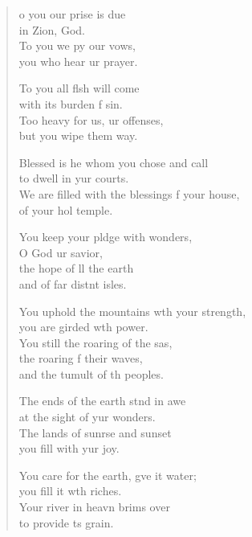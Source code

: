 \settowidth{\versewidth}{We are filled with the blessings of your house, *}
\begin{verse}%
  \begin{patverse}
o you our prise is due\Med\\
in Zion,  God.\\
To you we py our vows,\Med\\
you who hear ur prayer.

To you all flsh will come\Med\\
with its burden f sin.\\
Too heavy for us, ur offenses,\Med\\
but you wipe them way.

Blessed is he whom you chose and call\Med\\
to dwell in yur courts.\\
We are filled with the blessings f your house,\Med\\
of your hol temple.

You keep your pldge with wonders,\Med\\
O God ur savior,\\
the hope of ll the earth\Med\\
and of far distnt isles.

You uphold the mountains w\pointup{\i}th your strength,\Med\\
you are girded w\pointup{\i}th power.\\
You still the roaring of the sas,\Flex\\
the roaring f their waves,\Med\\
and the tumult of th peoples.

The ends of the earth stnd in awe\Med\\
at the sight of yur wonders.\\
The lands of sunr\pointup{\i}se and sunset\Med\\
you fill with yur joy.

You care for the earth, g\pointup{\i}ve it water;\Med\\
you fill it w\pointup{\i}th riches.\\
Your river in heavn brims over\Med\\
to provide \pointup{\i}ts grain.


\end{patverse}
\end{verse}
